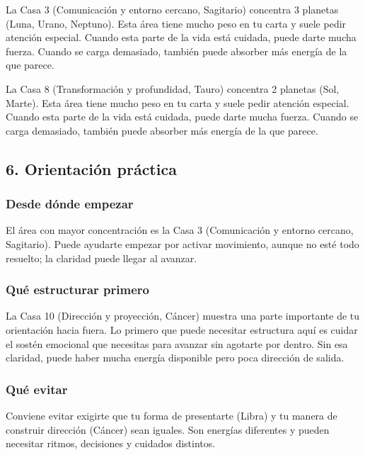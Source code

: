 \documentclass[11pt,a4paper]{article}
\begin{document}
La Casa 3 (Comunicación y entorno cercano, Sagitario) concentra 3 planetas (Luna, Urano, Neptuno). Esta área tiene mucho peso en tu carta y suele pedir atención especial. Cuando esta parte de la vida está cuidada, puede darte mucha fuerza. Cuando se carga demasiado, también puede absorber más energía de la que parece.

La Casa 8 (Transformación y profundidad, Tauro) concentra 2 planetas (Sol, Marte). Esta área tiene mucho peso en tu carta y suele pedir atención especial. Cuando esta parte de la vida está cuidada, puede darte mucha fuerza. Cuando se carga demasiado, también puede absorber más energía de la que parece.

\vspace{0.5cm}

\subsection{6. Orientación práctica}

\subsubsection*{Desde dónde empezar}
El área con mayor concentración es la Casa 3 (Comunicación y entorno cercano, Sagitario). Puede ayudarte empezar por activar movimiento, aunque no esté todo resuelto; la claridad puede llegar al avanzar.

\subsubsection*{Qué estructurar primero}
La Casa 10 (Dirección y proyección, Cáncer) muestra una parte importante de tu orientación hacia fuera. Lo primero que puede necesitar estructura aquí es cuidar el sostén emocional que necesitas para avanzar sin agotarte por dentro. Sin esa claridad, puede haber mucha energía disponible pero poca dirección de salida.

\subsubsection*{Qué evitar}
Conviene evitar exigirte que tu forma de presentarte (Libra) y tu manera de construir dirección (Cáncer) sean iguales. Son energías diferentes y pueden necesitar ritmos, decisiones y cuidados distintos.
\end{document}

